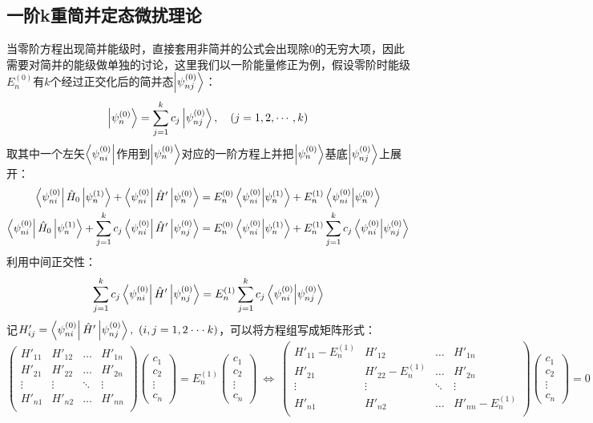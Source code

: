 \subsection{一阶k重简并定态微扰理论}
当零阶方程出现简并能级时，直接套用非简并的公式会出现除0的无穷大项，因此需要对简并的能级做单独的讨论，这里我们以一阶能量修正为例，假设零阶时能级$E_n^{(0)}$有$k$个经过正交化后的简并态$\ket{\psi_{nj}^{(0)}}$：
\[\ket{\psi_{n}^{(0)}}=\sum_{j=1}^{k}c_j\ket{\psi_{nj}^{(0)}}, \quad (j=1,2,\cdots,k)\]
取其中一个左矢$\bra{\psi_{ni}^{(0)}}$作用到$\ket{\psi_{n}^{(0)}}$对应的一阶方程上并把$\ket{\psi_{n}^{(0)}}$基底$\ket{\psi_{nj}^{(0)}}$上展开：
\[\begin{aligned}
\bra{\psi_{ni}^{(0)}}\hat{H}_0\ket{\psi_{n}^{(1)}}+\bra{\psi_{ni}^{(0)}}\hat{H}'\ket{\psi_{n}^{(0)}}&=E_n^{(0)}\bra{\psi_{ni}^{(0)}}\ket{\psi_{n}^{(1)}}+E_n^{(1)}\bra{\psi_{ni}^{(0)}}\ket{\psi_{n}^{(0)}}\\
\bra{\psi_{ni}^{(0)}}\hat{H}_0\ket{\psi_{n}^{(1)}}+\sum_{j=1}^{k}c_j\bra{\psi_{ni}^{(0)}}\hat{H}'\ket{\psi_{nj}^{(0)}}&=E_n^{(0)}\bra{\psi_{ni}^{(0)}}\ket{\psi_{n}^{(1)}}+E_n^{(1)}\sum_{j=1}^{k}c_j\bra{\psi_{ni}^{(0)}}\ket{\psi_{nj}^{(0)}}\\
\end{aligned}\]
利用中间正交性：
\[\sum_{j=1}^{k}c_j\bra{\psi_{ni}^{(0)}}\hat{H}'\ket{\psi_{nj}^{(0)}}=E_n^{(1)}\sum_{j=1}^{k}c_j\bra{\psi_{ni}^{(0)}}\ket{\psi_{nj}^{(0)}}\]
记$H'_{ij}=\bra{\psi_{ni}^{(0)}}\hat{H}'\ket{\psi_{nj}^{(0)}}, \ (i,j=1,2 \cdot\cdot\cdot k)$，可以将方程组写成矩阵形式：
\[\begin{pmatrix}
H'_{11} & H'_{12} & \ldots & H'_{1n}\\
H'_{21} & H'_{22} & \ldots & H'_{2n}\\
\vdots & \vdots & \ddots & \vdots\\
H'_{n1} & H'_{n2} & \ldots & H'_{nn}\\
\end{pmatrix}
\begin{pmatrix}c_1\\c_2\\\vdots\\c_n\end{pmatrix}
=E_n^{(1)}\begin{pmatrix}c_1\\c_2\\\vdots\\c_n\end{pmatrix}
\ \Leftrightarrow \
\begin{pmatrix}
H'_{11}-E_n^{(1)} & H'_{12} & \ldots & H'_{1n}\\
H'_{21} & H'_{22}-E_n^{(1)} & \ldots & H'_{2n}\\
\vdots & \vdots & \ddots & \vdots\\
H'_{n1} & H'_{n2} & \ldots & H'_{nn}-E_n^{(1)}\\
\end{pmatrix}
\begin{pmatrix}c_1\\c_2\\\vdots\\c_n\end{pmatrix}=0\]
